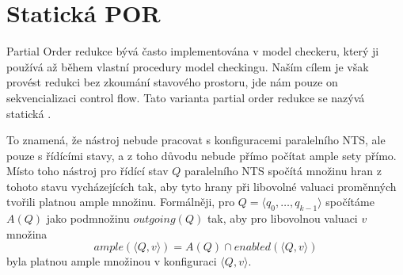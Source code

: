 \documentclass[12pt]{fithesis2}
\newcommand{\tuple}[1]{\langle #1 \rangle}
\begin{document}
\section{Statická POR}
Partial Order redukce bývá často implementována v model checkeru, který ji používá až během vlastní procedury model checkingu. Naším cílem je však provést redukci bez zkoumání stavového prostoru, jde nám pouze on sekvencializaci control flow. Tato varianta partial order redukce se nazývá statická \cite{SPOR}.

To znamená, že nástroj nebude pracovat s konfiguracemi paralelního NTS, ale pouze s řídícími stavy, a z toho důvodu nebude přímo počítat ample sety přímo. Místo toho nástroj pro řídící stav $Q$ paralelního NTS spočítá množinu hran z tohoto stavu vycházejících tak, aby tyto hrany při libovolné valuaci proměnných tvořili platnou ample množinu. Formálněji, pro $Q = \tuple{q_{0}, \ldots, q_{k-1}}$ spočítáme $A(Q)$ jako podmnožinu $\mathit{outgoing}(Q)$ tak, aby pro libovolnou valuaci $v$ množina
\begin{equation}
\mathit{ample}\left({\tuple{Q, v}}\right) = A(Q) \cap \mathit{enabled}\left({\tuple{Q, v}}\right)
\end{equation}
byla platnou ample množinou v konfiguraci $\tuple{Q,v}$.
\end{document}
